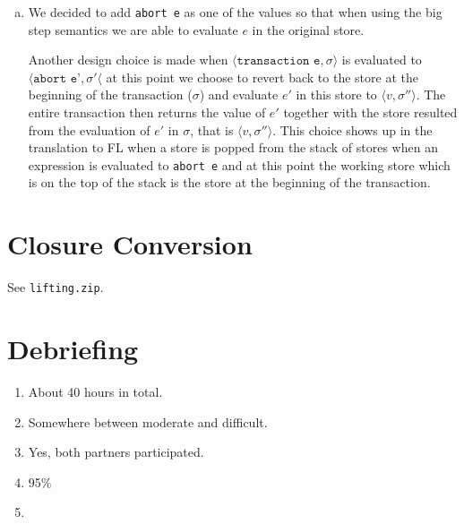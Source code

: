 \documentclass[10pt]{article}
\begin{document}
\begin{enumerate} [(a)]
    Let $\llbracket . \rrbracket_1$ be the translation from FL! to FL. We will define $\llbracket . \rrbracket_1$, the translation from the extended language to FL. Denote $\overline{\sigma}$ as a list of stores so $\# 1 \overline{\sigma}$ returns the head of the list and $\# 2 \overline{\sigma}$ is the tail.
    \begin{align*}
    \llbracket \texttt{transaction e}\rrbracket~\rho~\overline{\sigma} &\triangleq \llbracket e\rrbracket~\rho~(\#1 \overline{\sigma}, \overline{\sigma})\\
    \llbracket \texttt{abort e}\rrbracket~\rho~\overline{\sigma} &\triangleq \llbracket e\rrbracket~\rho~(\#2 \overline{\sigma})\\
    \text{For other expressions }&\text{that are not transaction nor abort:}\\
    \llbracket e\rrbracket~\rho~\overline{\sigma} &\triangleq \texttt{let (x,y) = }\llbracket e\rrbracket_1~\rho~(\#1 \overline{\sigma}) \texttt{ in } (x, (y, \# 2 \overline{\sigma}))
    \end{align*}
    The idea is that when evaluating \texttt{transaction e} we will push the current store onto the top of the list and continue evaluating $e$ in the current store. For \texttt{abort e} we will remove the first store in the list and $e$ will be evaluated in the next store since this is the store of the latest transaction.
    \item We decided to add \texttt{abort e} as one of the values so that when using the big step semantics we are able to evaluate $e$ in the original store.

    Another design choice is made when $\langle \texttt{transaction e}, \sigma \rangle$ is evaluated to $\langle \texttt{abort e'}, \sigma' \langle$ at this point we choose to revert back to the store at the beginning of the transaction ($\sigma$) and evaluate $e'$ in this store to $\langle v, \sigma'' \rangle$. The entire transaction then returns the value of $e'$ together with the store resulted from the evaluation of $e'$ in $\sigma$, that is $\langle v, \sigma'' \rangle$. This choice shows up in the translation to FL when a store is popped from the stack of stores when an expression is evaluated to \texttt{abort e} and at this point the working store which is on the top of the stack is the store at the beginning of the transaction.
    \end{enumerate}
\section{Closure Conversion}%
See \texttt{lifting.zip}.
\section{Debriefing}%
\begin{enumerate}
    \item About 40 hours in total.
    \item Somewhere between moderate and difficult.
    \item Yes, both partners participated.
    \item 95\%
    \item
\end{enumerate}
\end{document}
